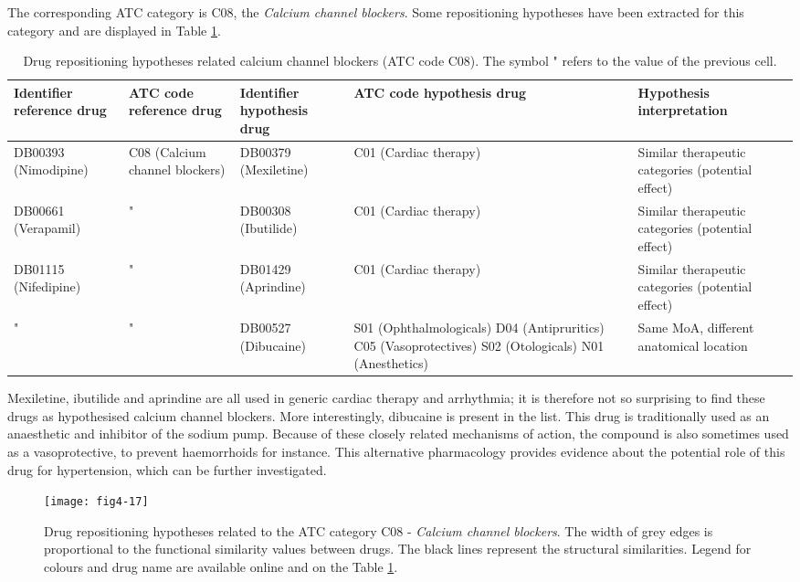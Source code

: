 The corresponding ATC category is C08, the \emph{Calcium channel blockers}. Some repositioning hypotheses have been extracted for this category and are displayed in Table \ref{tab:tablec08}. 

\begin{table}[htbp]
\scriptsize
\begin{tabular}{|p{2cm}|p{2cm}|p{2cm}|p{3cm}|p{4cm}|}
\hline
\textbf{Identifier reference drug} & \textbf{ATC code reference drug} & \textbf{Identifier hypothesis drug} & \textbf{ATC code hypothesis drug} & \textbf{Hypothesis interpretation} \\ \hline
DB00393 (Nimodipine) & C08 (Calcium channel blockers) & DB00379 (Mexiletine) & C01 (Cardiac therapy) & Similar therapeutic categories (potential effect) \\ \hline
DB00661 (Verapamil) & " & DB00308 (Ibutilide) & C01 (Cardiac therapy) & Similar therapeutic categories (potential effect) \\ \hline
DB01115 (Nifedipine) & " & DB01429 (Aprindine) & C01 (Cardiac therapy) & Similar therapeutic categories (potential effect) \\ \hline
" & " & DB00527 (Dibucaine) & S01 (Ophthalmologicals)
D04 (Antipruritics)
C05 (Vasoprotectives)
S02 (Otologicals)
N01 (Anesthetics) & Same MoA, different anatomical location \\ \hline
\end{tabular}
\caption{Drug repositioning hypotheses related calcium channel blockers (ATC code C08). The symbol " refers to the value of the previous cell.}
\label{tab:tablec08}
\end{table}

Mexiletine, ibutilide and aprindine are all used in generic cardiac therapy and arrhythmia; it is therefore not so surprising to find these drugs as hypothesised calcium channel blockers. More interestingly, dibucaine is present in the list. This drug is traditionally used as an anaesthetic and inhibitor of the sodium pump. Because of these closely related mechanisms of action, the compound is also sometimes used as a vasoprotective, to prevent haemorrhoids for instance. This alternative pharmacology provides evidence about the potential role of this drug for hypertension, which can be further investigated.

\begin{figure}[H]
    \centering
    \texttt{[image: fig4-17]}
    \caption{Drug repositioning hypotheses related to the ATC category C08 - \emph{Calcium channel blockers}. The width of grey edges is proportional to the functional similarity values between drugs. The black lines represent the structural similarities. Legend for colours and drug name are available online and on the Table \ref{tab:tablec08}.}
    \label{fig4-17}
\end{figure}

